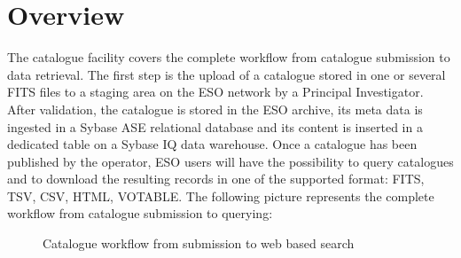 \section{Overview}
The catalogue facility covers the complete workflow from catalogue submission to data retrieval. The first step is the upload of a catalogue stored in one or several FITS files to a staging area on the ESO network by a Principal Investigator. After validation, the catalogue is stored in the ESO archive, its meta data is ingested in a Sybase ASE relational database and its content is inserted in a dedicated table on a Sybase IQ data warehouse. Once a catalogue has been published by the operator, ESO users will have the possibility to query catalogues and to download the resulting records in one of the supported format: FITS, TSV, CSV, HTML, VOTABLE. The following picture represents the complete workflow from catalogue submission to querying:
\begin{center}
\setlength\fboxsep{1pt}
\setlength\fboxrule{1pt}
\begin{figure}[h]
\caption{Catalogue workflow from submission to web based search}
\end{figure}
\end{center}

